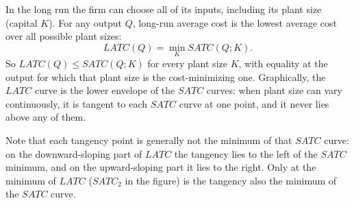 \documentclass[11pt, a4]{exam}
\begin{document}
\begin{questions}
\begin{parts}
\begin{solution}[1in]
In the long run the firm can choose all of its inputs, including its plant size (capital $K$). For any output $Q$, long-run average cost is the lowest average cost over all possible plant sizes:
\[
LATC(Q) = \min_{K} SATC(Q; K).
\]
So $LATC(Q) \leq SATC(Q;K)$ for every plant size $K$, with equality at the output for which that plant size is the cost-minimizing one. Graphically, the $LATC$ curve is the lower envelope of the $SATC$ curves: when plant size can vary continuously, it is tangent to each $SATC$ curve at one point, and it never lies above any of them.
\begin{center}
\end{center}
Note that each tangency point is generally not the minimum of that $SATC$ curve: on the downward-sloping part of $LATC$ the tangency lies to the left of the $SATC$ minimum, and on the upward-sloping part it lies to the right. Only at the minimum of $LATC$ ($SATC_2$ in the figure) is the tangency also the minimum of the $SATC$ curve.
\end{solution}


\bigskip

\bigskip

\bigskip

\bigskip

\bigskip

\bigskip

\bigskip

\bigskip

\bigskip


\end{parts}
\end{questions}
\end{document}
